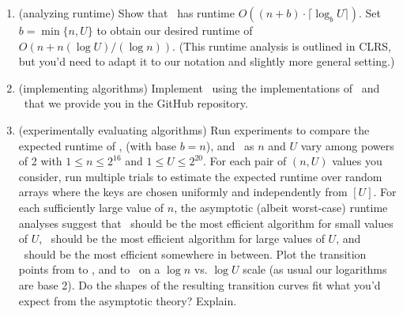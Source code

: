 \documentclass[11pt]{article}
\begin{document}
\begin{enumerate}
\begin{enumerate}
            
            \item (analyzing runtime) Show that \RadixSort\ has runtime $O((n+b)\cdot \lceil \log_b U\rceil)$.  Set $b=\min\{n,U\}$ to obtain our desired runtime of $O(n+n(\log U)/(\log n))$.  (This runtime analysis is outlined in CLRS, but you'd need to adapt it to our notation and slightly more general setting.) 
            
            \item (implementing algorithms)
            Implement \RadixSort\ using the implementations of \CountingSort\ and \BC\ that we provide you in the GitHub repository. 
  
 \iffalse           
            Provide a more detailed pseudocode description of Radix Sort (for arrays of item-key pairs) following the above outline, using Counting Sort as a subroutine.  The inputs to Counting Sort are a natural number $U$ and an array $A$ of item-key pairs where the items are arbitrary objects and the keys are elements of $[U]$, so for each call your pseudocode makes to Counting Sort,  it should explicitly say what value of $U$ and what array $A$ is fed in. 
            Implement your version of Radix Sort in Python, using the implementation of Counting Sort that we will provide you in the github repository.
                The inputs to your implementation of Radix Sort should consist of an array of item-key pairs, the length $n$ of the array, the universe size $U$, and the
                base $b$.
\fi

            \item (experimentally evaluating algorithms) Run experiments to compare the expected runtime of \CountingSort, \RadixSort (with base $b=n$), and \MergeSort\ as $n$ and $U$ vary among powers of 2 with $1\leq n\leq 2^{16}$ and $1\leq U\leq 2^{20}$.  For each pair of $(n,U)$ values you consider, run multiple trials to estimate the expected runtime over random arrays where the keys are chosen uniformly and independently from $[U]$.  For each sufficiently large value of $n$, the asymptotic (albeit worst-case) runtime analyses suggest that \CountingSort\ should be the most efficient algorithm for small values of $U$, \MergeSort\ should be the most efficient algorithm for large values of $U$, and \RadixSort\ should be the most efficient somewhere in between.  Plot the transition points from \CountingSort to \RadixSort, and \RadixSort to \MergeSort\ on a $\log n$ vs. $\log U$ scale (as usual our logarithms are base 2).  Do the shapes of the resulting transition curves fit what you'd expect from the asymptotic theory?  Explain.  %
            

\end{enumerate}
\end{enumerate}
\end{document}
